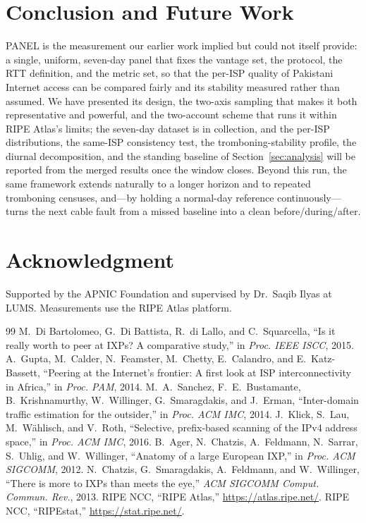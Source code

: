 \documentclass[conference]{IEEEtran}
\begin{document}
\section{Conclusion and Future Work}
\label{sec:conclusion}
PANEL is the measurement our earlier work implied but could not itself provide: a single, uniform,
seven-day panel that fixes the vantage set, the protocol, the RTT definition, and the metric set, so
that the per-ISP quality of Pakistani Internet access can be compared fairly and its stability
measured rather than assumed. We have presented its design, the two-axis sampling that makes it both
representative and powerful, and the two-account scheme that runs it within RIPE Atlas's limits; the
seven-day dataset is in collection, and the per-ISP distributions, the same-ISP consistency test, the
tromboning-stability profile, the diurnal decomposition, and the standing baseline of
Section~\ref{sec:analysis} will be reported from the merged results once the window closes. Beyond
this run, the same framework extends naturally to a longer horizon and to repeated tromboning
censuses, and---by holding a normal-day reference continuously---turns the next cable fault from a
missed baseline into a clean before/during/after.

\section*{Acknowledgment}
Supported by the APNIC Foundation and supervised by Dr.\ Saqib Ilyas at LUMS. Measurements use the
RIPE Atlas platform.

\begin{thebibliography}{99}
 M.~Di Bartolomeo, G.~Di Battista, R.~di Lallo, and C.~Squarcella,
``Is it really worth to peer at IXPs? A comparative study,'' in \emph{Proc. IEEE ISCC}, 2015.
 A.~Gupta, M.~Calder, N.~Feamster, M.~Chetty, E.~Calandro, and
E.~Katz-Bassett, ``Peering at the Internet's frontier: A first look at ISP interconnectivity in
Africa,'' in \emph{Proc. PAM}, 2014.
 M.~A.~Sanchez, F.~E.~Bustamante, B.~Krishnamurthy, W.~Willinger,
G.~Smaragdakis, and J.~Erman, ``Inter-domain traffic estimation for the outsider,'' in
\emph{Proc. ACM IMC}, 2014.
 J.~Klick, S.~Lau, M.~W\"ahlisch, and V.~Roth, ``Selective, prefix-based
scanning of the IPv4 address space,'' in \emph{Proc. ACM IMC}, 2016. %
 B.~Ager, N.~Chatzis, A.~Feldmann, N.~Sarrar, S.~Uhlig, and W.~Willinger,
``Anatomy of a large European IXP,'' in \emph{Proc. ACM SIGCOMM}, 2012.
 N.~Chatzis, G.~Smaragdakis, A.~Feldmann, and W.~Willinger, ``There is more
to IXPs than meets the eye,'' \emph{ACM SIGCOMM Comput. Commun. Rev.}, 2013.
 RIPE NCC, ``RIPE Atlas,'' \url{https://atlas.ripe.net/}.
 RIPE NCC, ``RIPEstat,'' \url{https://stat.ripe.net/}.
\end{thebibliography}
\end{document}

